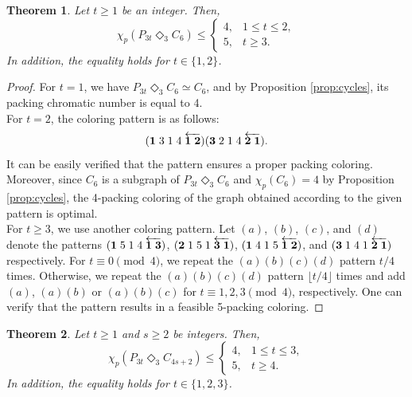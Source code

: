 \documentclass{article}
\newtheorem{theorem}{Theorem}
\begin{document}
\begin{theorem} Let $t \geq 1$ be an integer. Then,
    $$\chi_p(P_{3t}\Diamond_3 C_6)\leq\left\{
\begin{array}{ll}
4, & 1 \leq t \leq 2,\\
5, & t \geq 3.
\end{array}\right.
$$
In addition, the equality holds for $t \in \{1,2\}$. 
\end{theorem}
\begin{proof}
For $t=1$, we have $P_{3t} \Diamond_3 C_6 \simeq C_6$, and by Proposition \ref{prop:cycles}, its packing chromatic number is equal to 4.
\\For $t=2$, the coloring pattern is as follows:
$$({\bf 1}\; 3\; 1\; 4\; \overleftarrow{{\bf 1\;2}})({\bf 3}\; 2\; 1\; 4\; \overleftarrow{{\bf 2\;1}}).$$
It can be easily verified that the pattern ensures a proper packing coloring.
Moreover, since $C_6$ is a subgraph of $P_{3t} \Diamond_3 C_6$ and $\chi_p(C_6)=4$ by Proposition \ref{prop:cycles}, the 4-packing coloring of the graph obtained according to the given pattern is optimal.
\\For $t\geq 3$, we use another coloring pattern. %
Let $(a)$, $(b)$, $(c)$, and $(d)$ denote the patterns
$({\bf 1}\;5\;1\;4\;\overleftarrow{{\bf 1\;3}})$, $({\bf 2}\;1\;5\;1\;\overleftarrow{{\bf 3\; 1}})$, $({\bf 1}\; 4\;1\;5\;\overleftarrow{{\bf 1\;2}})$, and $({\bf 3}\;1\;4\;1\;\overleftarrow{{\bf 2\; 1}})$ respectively. 
For $t \equiv 0 \pmod{4}$, we repeat the $(a)(b)(c)(d)$ pattern $t/4$ times. Otherwise, we repeat the $(a)(b)(c)(d)$ pattern $\lfloor t /4 \rfloor$ times and add $(a)$, $(a)(b)$ or $(a)(b)(c)$ for $t \equiv 1, 2, 3 \pmod{4}$, respectively.  
One can verify that the pattern results in a feasible 5-packing coloring.
\end{proof}
\begin{theorem}
    Let $t\geq 1$ and $s\geq 2$ be integers. Then, 
    $$\chi_p(P_{3t}\Diamond_3 C_{4s+2})\leq\left\{
\begin{array}{ll}
4, & 1 \leq t \leq 3,\\
5, & t \geq 4.
\end{array}\right.
$$
In addition, the equality holds for $t \in \{1,2,3\}$. 
\end{theorem}
\end{document}
